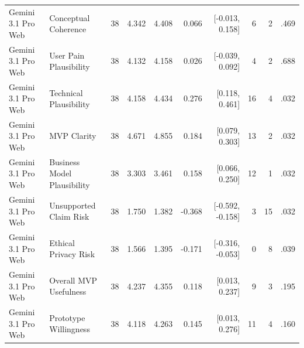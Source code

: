 \documentclass[10pt]{article}
\begin{document}
\begin{landscape}
\begin{longtable}{llrrrrrrrr}
Gemini 3.1 Pro Web & Conceptual Coherence & 38 & 4.342 & 4.408 & 0.066 & [-0.013, 0.158] & 6 & 2 & .469 \\
Gemini 3.1 Pro Web & User Pain Plausibility & 38 & 4.132 & 4.158 & 0.026 & [-0.039, 0.092] & 4 & 2 & .688 \\
Gemini 3.1 Pro Web & Technical Plausibility & 38 & 4.158 & 4.434 & 0.276 & [0.118, 0.461] & 16 & 4 & .032 \\
Gemini 3.1 Pro Web & MVP Clarity & 38 & 4.671 & 4.855 & 0.184 & [0.079, 0.303] & 13 & 2 & .032 \\
Gemini 3.1 Pro Web & Business Model Plausibility & 38 & 3.303 & 3.461 & 0.158 & [0.066, 0.250] & 12 & 1 & .032 \\
Gemini 3.1 Pro Web & Unsupported Claim Risk & 38 & 1.750 & 1.382 & -0.368 & [-0.592, -0.158] & 3 & 15 & .032 \\
Gemini 3.1 Pro Web & Ethical Privacy Risk & 38 & 1.566 & 1.395 & -0.171 & [-0.316, -0.053] & 0 & 8 & .039 \\
Gemini 3.1 Pro Web & Overall MVP Usefulness & 38 & 4.237 & 4.355 & 0.118 & [0.013, 0.237] & 9 & 3 & .195 \\
Gemini 3.1 Pro Web & Prototype Willingness & 38 & 4.118 & 4.263 & 0.145 & [0.013, 0.276] & 11 & 4 & .160 \\
\end{longtable}
\end{landscape}
\end{document}
